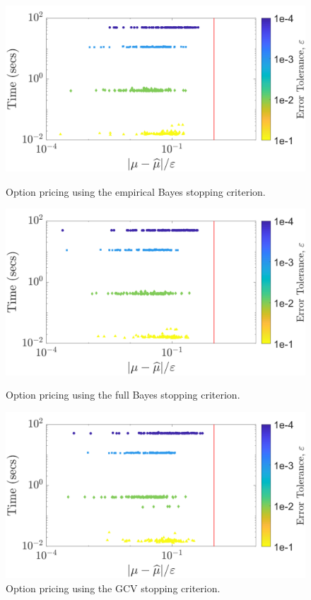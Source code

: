 \documentclass[twocolumn]{svjour3}          %
\begin{document}
\begin{figure}
	\centering
	\includegraphics[width=0.95\linewidth]{"optPrice_guaranteed_time_MLE_Baker_d12_r1_2018-Sep-6"}
	\caption[Option pricing Guaranteed: MLE]{Option pricing using the empirical Bayes stopping criterion.}
	\label{fig:optprice-guaranteed-MLE}
	\centering
	\includegraphics[width=0.95\linewidth]{"optPrice_guaranteed_time_full_Baker_d12_r1_2018-Sep-6"}
	\caption[OptPrice guaranteed : FB]{Option pricing using the full Bayes stopping criterion.}
	\label{fig:optprice-guaranteed-FB}
	\centering
	\includegraphics[width=0.95\linewidth]{"optPrice_guaranteed_time_GCV_Baker_d12_r1_2018-Sep-6"}
	\caption[OptPrice guaranteed : GCV]{Option pricing using the  GCV stopping criterion.}
	\label{fig:optprice-guaranteed-GCV}
\end{figure}
\end{document}
